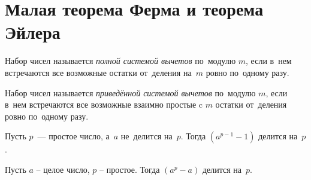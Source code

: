 
\section*{Малая теорема Ферма и теорема Эйлера}


Набор чисел называется \emph{полной системой вычетов} по~модулю $m$, если в~нем
встречаются все возможные остатки от~деления на~$m$ ровно по~одному разу.

Набор чисел называется \emph{приведённой системой вычетов} по~модулю $m$, если
в~нем встречаются все возможные взаимно простые c $m$ остатки от~деления ровно
по~одному разу.

\mbox{}%
Пусть $p$~--- простое число, а~$a$ не~делится на~$p$.
Тогда $(a^{p-1} - 1)$ делится на~$p$.

\mbox{}%
Пусть $a$ -- целое число, $p$ -- простое.
Тогда $(a^p - a)$ делится на~$p$.

